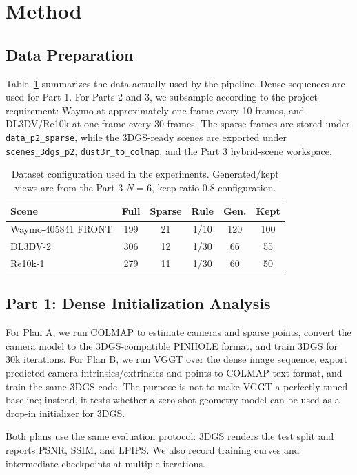 \documentclass[10pt,twocolumn,letterpaper]{article}
\begin{document}
\section{Method}

\subsection{Data Preparation}

Table~\ref{tab:datasets} summarizes the data actually used by the pipeline.  Dense sequences are used for Part 1.  For Parts 2 and 3, we subsample according to the project requirement: Waymo at approximately one frame every 10 frames, and DL3DV/Re10k at one frame every 30 frames.  The sparse frames are stored under \texttt{data\_p2\_sparse}, while the 3DGS-ready scenes are exported under \texttt{scenes\_3dgs\_p2}, \texttt{dust3r\_to\_colmap}, and the Part 3 hybrid-scene workspace.

\begin{table}[!htbp]
\centering
\caption{Dataset configuration used in the experiments.  Generated/kept views are from the Part 3 $N=6$, keep-ratio $0.8$ configuration.}
\label{tab:datasets}
\begin{tabular}{lccccc}
\toprule
Scene & Full & Sparse & Rule & Gen. & Kept \\
\midrule
Waymo-405841 FRONT & 199 & 21 & 1/10 & 120 & 100 \\
DL3DV-2 & 306 & 12 & 1/30 & 66 & 55 \\
Re10k-1 & 279 & 11 & 1/30 & 60 & 50 \\
\bottomrule
\end{tabular}
\end{table}

\subsection{Part 1: Dense Initialization Analysis}

For Plan A, we run COLMAP to estimate cameras and sparse points, convert the camera model to the 3DGS-compatible PINHOLE format, and train 3DGS for 30k iterations.  For Plan B, we run VGGT over the dense image sequence, export predicted camera intrinsics/extrinsics and points to COLMAP text format, and train the same 3DGS code.  The purpose is not to make VGGT a perfectly tuned baseline; instead, it tests whether a zero-shot geometry model can be used as a drop-in initializer for 3DGS.

Both plans use the same evaluation protocol: 3DGS renders the test split and reports PSNR, SSIM, and LPIPS.  We also record training curves and intermediate checkpoints at multiple iterations.
\end{document}
